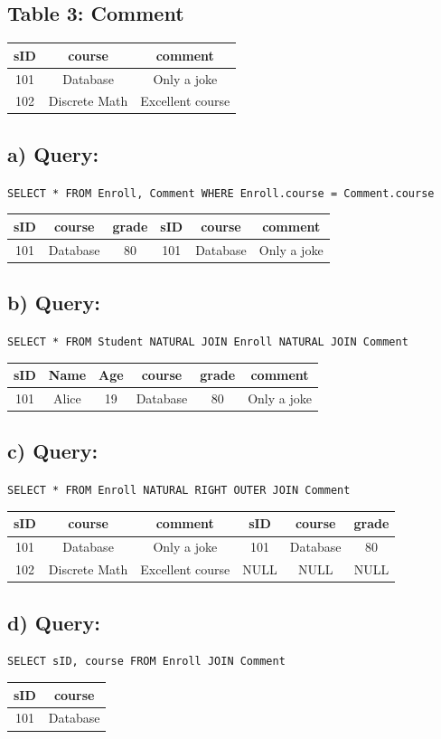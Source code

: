\documentclass{article}
\begin{document}
\subsection*{Table 3: Comment}
\begin{tabular}{|c|c|c|}
	\hline
	sID & course         & comment                 \\
	\hline
	101 & Database       & Only a joke             \\
	102 & Discrete Math  & Excellent course         \\
	\hline
\end{tabular}

\subsection*{a) Query:}
\texttt{SELECT * FROM Enroll, Comment WHERE Enroll.course = Comment.course}

\begin{tabular}{|c|c|c|c|c|c|}
	\hline
	sID & course   & grade & sID & course   & comment       \\
	\hline
	101 & Database & 80    & 101 & Database & Only a joke   \\
	\hline
\end{tabular}

\subsection*{b) Query:}
\texttt{SELECT * FROM Student NATURAL JOIN Enroll NATURAL JOIN Comment}

\begin{tabular}{|c|c|c|c|c|c|}
	\hline
	sID & Name  & Age & course   & grade & comment       \\
	\hline
	101 & Alice & 19  & Database & 80    & Only a joke   \\
	\hline
\end{tabular}

\subsection*{c) Query:}
\texttt{SELECT * FROM Enroll NATURAL RIGHT OUTER JOIN Comment}

\begin{tabular}{|c|c|c|c|c|c|}
	\hline
	sID & course & comment & sID & course & grade \\
	\hline
	101 & Database & Only a joke & 101 & Database & 80 \\
	102 & Discrete Math & Excellent course & NULL & NULL & NULL \\
	\hline
\end{tabular}

\subsection*{d) Query:}
\texttt{SELECT sID, course FROM Enroll JOIN Comment}

\begin{tabular}{|c|c|}
	\hline
	sID & course   \\
	\hline
	101 & Database \\
	\hline
\end{tabular}
	
\end{document}
